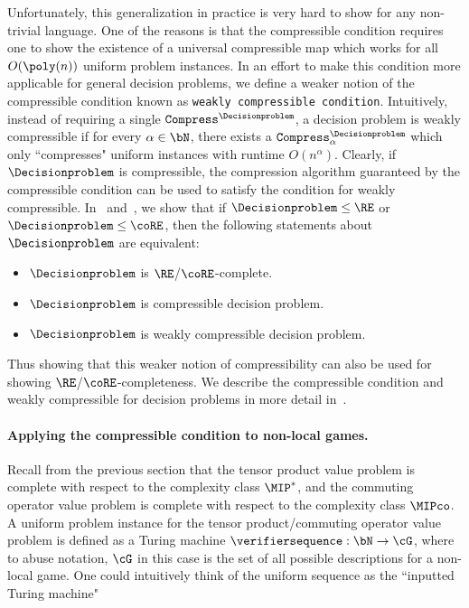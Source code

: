 Unfortunately, this generalization in practice is very hard to show for any non-trivial language. One of the reasons is that the compressible condition requires one to show the existence of a universal compressible map which works for all $O(\poly(n))$ uniform problem instances. In an effort to make this condition more applicable for general decision problems, we define a weaker notion of the compressible condition known as \texttt{weakly compressible condition}. Intuitively, instead of requiring a single $\texttt{Compress}^{\Decisionproblem}$, a decision problem is weakly compressible if for every $\alpha \in \bN$, there exists a $\texttt{Compress}^{\Decisionproblem}_{\alpha}$ which only ``compresses" uniform instances with runtime $O(n^{\alpha})$. Clearly, if $\Decisionproblem$ is compressible, the compression algorithm guaranteed by the compressible condition can be used to satisfy the condition for weakly compressible. In~ and~, we show that if $\Decisionproblem \leq \RE$ or $\Decisionproblem \leq \coRE$, then the following statements about $\Decisionproblem$ are equivalent:
\begin{itemize}
	\item $\Decisionproblem$ is $\RE$/$\coRE$-complete.
	\item $\Decisionproblem$ is compressible decision problem. 
	\item $\Decisionproblem$ is weakly compressible decision problem. 
\end{itemize}
Thus showing that this weaker notion of compressibility can also be used for showing $\RE$/$\coRE$-completeness. We describe the compressible condition and weakly compressible for decision problems in more detail in~.

\paragraph{Applying the compressible condition to non-local games.} Recall from the previous section that the tensor product value problem is complete with respect to the complexity class $\MIP^{*}$, and the commuting operator value problem is complete with respect to the complexity class $\MIPco$. A uniform problem instance for the tensor product/commuting operator value problem is defined as a Turing machine $\verifiersequence: \bN \rightarrow \cG$, where to abuse notation, $\cG$ in this case is the set of all possible descriptions for a non-local game. One could intuitively think of the uniform sequence as the ``inputted Turing machine"

